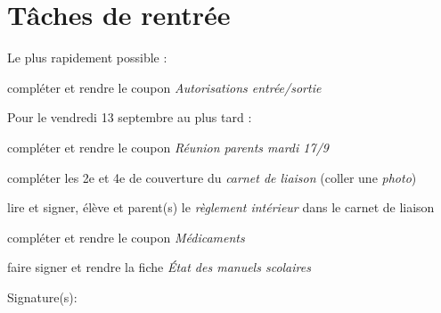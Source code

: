 \documentclass[10pt,a5paper]{article}
\begin{document}
\section*{Tâches de rentrée}

Le plus rapidement possible :

\begin{todolist}
    \item compléter et rendre le coupon \emph{Autorisations entrée/sortie}
\end{todolist}

Pour le vendredi 13 septembre au plus tard :
\begin{todolist}
\item  compléter et rendre le coupon \emph{Réunion parents mardi 17/9}
\item  compléter les 2e et 4e de couverture du \emph{carnet de liaison} (coller une \emph{photo})
\item  lire et signer, élève et parent(s) le \emph{règlement intérieur} dans le carnet de liaison
\item  compléter et rendre le coupon \emph{Médicaments}
\item  faire signer et rendre la fiche \emph{État des manuels scolaires}
\end{todolist}
Signature(s):
\end{document}
